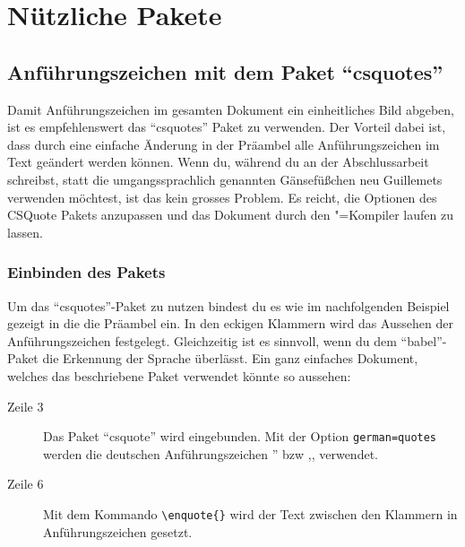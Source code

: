 %
%

\chapter{Nützliche Pakete}

\section{Anführungszeichen mit dem Paket \enquote{csquotes}}
\label{sec:anfuehrungszeichen}

Damit Anführungszeichen im gesamten Dokument ein einheitliches Bild abgeben, ist es empfehlenswert das \enquote{csquotes} Paket zu verwenden. Der Vorteil dabei ist, dass durch eine einfache Änderung in der Präambel alle Anführungszeichen im Text geändert werden können. Wenn du, während du an der Abschlussarbeit schreibst, statt die umgangssprachlich genannten Gänsefüßchen neu Guillemets verwenden möchtest, ist das kein grosses Problem. Es reicht, die Optionen des CSQuote Pakets anzupassen und das Dokument durch den \DMLLaTeX"=Kompiler laufen zu lassen.

\subsection{Einbinden des Pakets}

Um das \enquote{csquotes}-Paket zu nutzen bindest du es wie im nachfolgenden Beispiel gezeigt in die die Präambel ein. In den eckigen Klammern wird das Aussehen der Anführungszeichen festgelegt. Gleichzeitig ist es sinnvoll, wenn du dem \enquote{babel}-Paket die Erkennung der Sprache überlässt. Ein ganz einfaches Dokument, welches das beschriebene Paket verwendet könnte so aussehen:



\begin{description}
\item[Zeile 3] Das Paket \enquote{csquote} wird eingebunden. Mit der Option \texttt{german=quotes} werden die deutschen Anführungszeichen '' bzw ,, verwendet.
\item[Zeile 6] Mit dem Kommando \texttt{\textbackslash enquote\{\}} wird der Text zwischen den Klammern in Anführungszeichen gesetzt.
\end{description}

